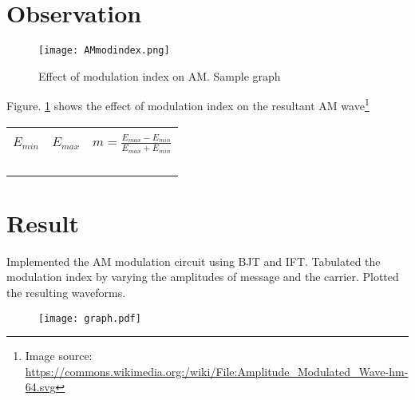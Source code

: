 \section*{Observation}


\begin{figure}[h]

\texttt{[image: AMmodindex.png]}
\caption{Effect of modulation index on AM. Sample graph}
\label{AMmodindex1}
\end{figure}
\noindent Figure. \ref{AMmodindex1}  shows the effect of modulation index on the resultant AM wave\footnote{Image source: \url{https://commons.wikimedia.org:/wiki/File:Amplitude_Modulated_Wave-hm-64.svg}}
\begin{center}

\begin{tabular}{|l|l|l|}

\hline
 & &\\
 
$E_{min}$  & $E_{max}$ & $m=\frac{E_{max}-E_{min}}{E_{max}+E_{min}}$ \\
 & & \\ \hline
 & & \\ \hline
& & \\ \hline
& & \\ \hline
\end{tabular}
\end{center}

\section*{Result}
Implemented the AM modulation circuit using BJT and IFT. Tabulated the modulation index by varying the amplitudes of message and the carrier. Plotted the resulting waveforms.

\begin{figure}
\texttt{[image: graph.pdf]}
\end{figure}



